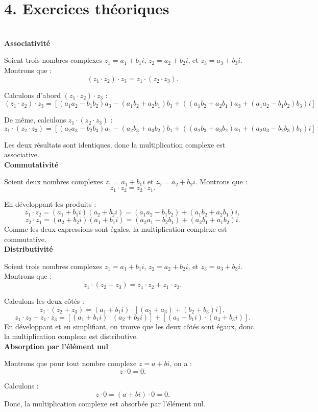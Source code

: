 \section*{4. Exercices théoriques}
\begin{solution}
    \text{ } \\


\textbf{Associativité}

Soient trois nombres complexes $z_1 = a_1 + b_1i$, $z_2 = a_2 + b_2i$, et $z_3 = a_3 + b_3i$. Montrons que :
\[
(z_1 \cdot z_2) \cdot z_3 = z_1 \cdot (z_2 \cdot z_3).
\]

Calculons d'abord $(z_1 \cdot z_2) \cdot z_3$ :
\[
(z_1 \cdot z_2) \cdot z_3 = [(a_1a_2 - b_1b_2)a_3 - (a_1b_2 + a_2b_1)b_3 + ((a_1b_2 + a_2b_1)a_3 + (a_1a_2 - b_1b_2)b_3)i]
\]

De même, calculons $z_1 \cdot (z_2 \cdot z_3)$ :
\[
z_1 \cdot (z_2 \cdot z_3) = [(a_2a_3 - b_2b_3)a_1 - (a_2b_3 + a_3b_2)b_1 + ((a_2b_3 + a_3b_2)a_1 + (a_2a_3 - b_2b_3)b_1)i]
\]

Les deux résultats sont identiques, donc la multiplication complexe est associative. \\

\textbf{Commutativité}

Soient deux nombres complexes $z_1 = a_1 + b_1i$ et $z_2 = a_2 + b_2i$. Montrons que :
\[
z_1 \cdot z_2 = z_2 \cdot z_1.
\]

En développant les produits :
\[
z_1 \cdot z_2 = (a_1 + b_1i)(a_2 + b_2i) = (a_1a_2 - b_1b_2) + (a_1b_2 + a_2b_1)i,
\]
\[
z_2 \cdot z_1 = (a_2 + b_2i)(a_1 + b_1i) = (a_2a_1 - b_2b_1) + (a_2b_1 + a_1b_2)i.
\]
Comme les deux expressions sont égales, la multiplication complexe est commutative. \\

\textbf{Distributivité}

Soient trois nombres complexes $z_1 = a_1 + b_1i$, $z_2 = a_2 + b_2i$, et $z_3 = a_3 + b_3i$. Montrons que :
\[
z_1 \cdot (z_2 + z_3) = z_1 \cdot z_2 + z_1 \cdot z_3.
\]

Calculons les deux côtés :
\[
z_1 \cdot (z_2 + z_3) = (a_1 + b_1i) \cdot [(a_2 + a_3) + (b_2 + b_3)i],
\]
\[
z_1 \cdot z_2 + z_1 \cdot z_3 = [(a_1 + b_1i) \cdot (a_2 + b_2i)] + [(a_1 + b_1i) \cdot (a_3 + b_3i)].
\]
En développant et en simplifiant, on trouve que les deux côtés sont égaux, donc la multiplication complexe est distributive. \\

\textbf{Absorption par l'élément nul}

Montrons que pour tout nombre complexe $z = a + bi$, on a :
\[
z \cdot 0 = 0.
\]

Calculons :
\[
z \cdot 0 = (a + bi) \cdot 0 = 0.
\]
Donc, la multiplication complexe est absorbée par l'élément nul. 
\end{solution}

